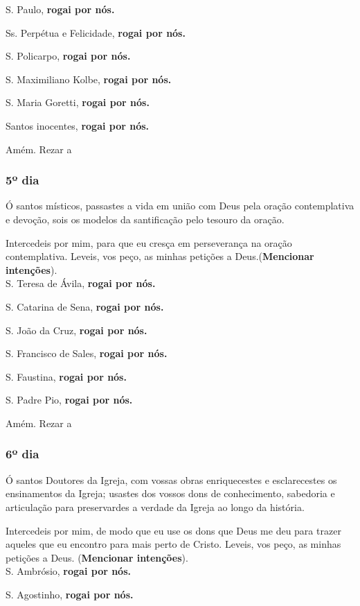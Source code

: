 \documentclass[a4paper,14pt]{extarticle} \usepackage[utf8]{inputenc}
\begin{document}
S. Paulo, \textbf{rogai por nós.}

Ss. Perpétua e Felicidade, \textbf{rogai por nós.}

S. Policarpo, \textbf{rogai por nós.}

S. Maximiliano Kolbe, \textbf{rogai por nós.}

S. Maria Goretti, \textbf{rogai por nós.}

Santos inocentes, \textbf{rogai por nós.}

Amém. Rezar a 
\subsubsection{5º dia}

Ó santos místicos, passastes a vida em união com Deus pela oração contemplativa e devoção, sois os modelos da santificação pelo tesouro da oração.

Intercedeis por mim, para que eu cresça em perseverança na oração contemplativa. Leveis, vos peço, as minhas petições a Deus.(\textbf{Mencionar intenções}).\\

S. Teresa de Ávila, \textbf{rogai por nós.}

S. Catarina de Sena, \textbf{rogai por nós.}

S. João da Cruz, \textbf{rogai por nós.}

S. Francisco de Sales, \textbf{rogai por nós.}

S. Faustina, \textbf{rogai por nós.}

S. Padre Pio, \textbf{rogai por nós.}

Amém. Rezar a 
\subsubsection{6º dia}

Ó santos Doutores da Igreja, com vossas obras enriquecestes e esclarecestes os ensinamentos da Igreja; usastes dos vossos dons de conhecimento, sabedoria e articulação para preservardes a verdade da Igreja ao longo da história.

Intercedeis por mim, de modo que eu use os dons que Deus me deu para trazer aqueles que eu encontro para mais perto de Cristo. Leveis, vos peço, as minhas petições a Deus. (\textbf{Mencionar intenções}).\\

S. Ambrósio, \textbf{rogai por nós.}

S. Agostinho, \textbf{rogai por nós.}
\end{document}
